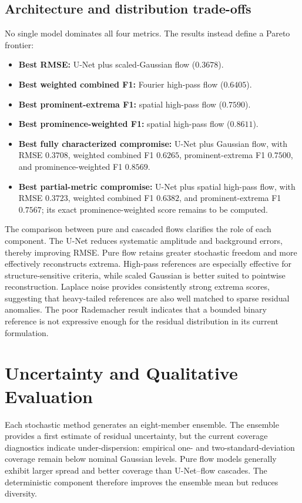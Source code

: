 \documentclass[11pt]{article}
\begin{document}
\subsection{Architecture and distribution trade-offs}

No single model dominates all four metrics. The results instead define a Pareto frontier:
\begin{itemize}[leftmargin=1.5em]
    \item \textbf{Best RMSE:} U-Net plus scaled-Gaussian flow ($0.3678$).
    \item \textbf{Best weighted combined F1:} Fourier high-pass flow ($0.6405$).
    \item \textbf{Best prominent-extrema F1:} spatial high-pass flow ($0.7590$).
    \item \textbf{Best prominence-weighted F1:} spatial high-pass flow ($0.8611$).
    \item \textbf{Best fully characterized compromise:} U-Net plus Gaussian flow, with RMSE $0.3708$, weighted combined F1 $0.6265$, prominent-extrema F1 $0.7500$, and prominence-weighted F1 $0.8569$.
    \item \textbf{Best partial-metric compromise:} U-Net plus spatial high-pass flow, with RMSE $0.3723$, weighted combined F1 $0.6382$, and prominent-extrema F1 $0.7567$; its exact prominence-weighted score remains to be computed.
\end{itemize}

The comparison between pure and cascaded flows clarifies the role of each component. The U-Net reduces systematic amplitude and background errors, thereby improving RMSE. Pure flow retains greater stochastic freedom and more effectively reconstructs extrema. High-pass references are especially effective for structure-sensitive criteria, while scaled Gaussian is better suited to pointwise reconstruction. Laplace noise provides consistently strong extrema scores, suggesting that heavy-tailed references are also well matched to sparse residual anomalies. The poor Rademacher result indicates that a bounded binary reference is not expressive enough for the residual distribution in its current formulation.

\section{Uncertainty and Qualitative Evaluation}

Each stochastic method generates an eight-member ensemble. The ensemble provides a first estimate of residual uncertainty, but the current coverage diagnostics indicate under-dispersion: empirical one- and two-standard-deviation coverage remain below nominal Gaussian levels. Pure flow models generally exhibit larger spread and better coverage than U-Net--flow cascades. The deterministic component therefore improves the ensemble mean but reduces diversity.
\end{document}
